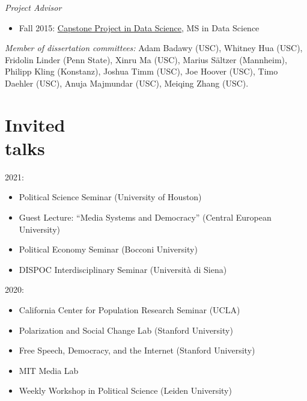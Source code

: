 \documentclass[margin,line,11pt]{resume}
\begin{document}
\begin{resume}
\emph{Project Advisor}
\begin{itemize}
\item Fall 2015: \href{http://cds.nyu.edu/academics/ms-in-data-science/curriculum/required-courses/#ds-ga-1006}{Capstone Project in Data Science}, MS in Data Science
\end{itemize}

\emph{Member of dissertation committees:} Adam Badawy (USC), Whitney Hua (USC), Fridolin Linder (Penn State), Xinru Ma (USC), Marius S\"{a}ltzer (Mannheim), Philipp Kling (Konstanz), Joshua Timm (USC), Joe Hoover (USC), Timo Daehler (USC), Anuja Majmundar (USC), Meiqing Zhang (USC).




        \section{\mysidestyle Invited\\talks}
2021:
\begin{itemize}
\item Political Science Seminar (University of Houston)
\item Guest Lecture: ``Media Systems and Democracy'' (Central European University)
\item Political Economy Seminar (Bocconi University)
\item DISPOC Interdisciplinary Seminar (Universit\`{a} di Siena)
\end{itemize}

2020:
\begin{itemize}
\item California Center for Population Research Seminar (UCLA)
\item Polarization and Social Change Lab (Stanford University)
\item Free Speech, Democracy, and the Internet (Stanford University)
\item MIT Media Lab
\item Weekly Workshop in Political Science (Leiden University)
\end{itemize}    
    

\end{resume}
\end{document}
